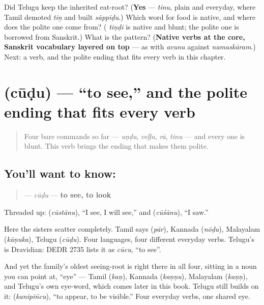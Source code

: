 \begin{tcolorbox}[breakable,colback=teal!4,colframe=teal!35!black,title={Before you move on}]
Did Telugu keep the inherited eat-root? (\textbf{Yes} — \emph{tinu}, plain and everyday, where Tamil demoted \emph{tiṉ} and built \emph{sāppiḍu}.) Which word for food is native, and where does the polite one come from? (\textbf{} \emph{tiṇḍi} is native and blunt; the polite one is borrowed from Sanskrit.) What is the pattern? (\textbf{Native verbs at the core, Sanskrit vocabulary layered on top} — as with \emph{avunu} against \emph{namaskāram}.) Next: a verb, and the polite ending that fits every verb in this chapter.
\end{tcolorbox}
\section[\texorpdfstring{\te{చూడు} (cūḍu)}{చూడు (cūḍu)}]{ (cūḍu) — \textquotedblleft{}to see,\textquotedblright{} and the polite ending that fits every verb}

\label{lesson:TE-C32-cuudu}



\begin{quote}
Four bare commands so far — \emph{uṇḍu}, \emph{veḷḷu}, \emph{rā}, \emph{tinu} — and every one is blunt. This verb brings the ending that makes them polite.
\end{quote}

\subsection*{You'll want to know: }
\begin{quote}
\textbf{} — \emph{cūḍu} — \textbf{to see, to look}
\end{quote}

Threaded up: \textbf{} (\emph{cūstānu}), \textquotedblleft{}I see, I will see,\textquotedblright{} and \textbf{} (\emph{cūśānu}), \textquotedblleft{}I saw.\textquotedblright{}

Here the sisters scatter completely. Tamil says \textbf{} (\emph{pār}), Kannada \textbf{} (\emph{nōḍu}), Malayalam \textbf{} (\emph{kāṇuka}), Telugu \textbf{} (\emph{cūḍu}). Four languages, four different everyday verbs. Telugu's is Dravidian: DEDR 2735 lists it as \emph{cūcu}, \textquotedblleft{}to see\textquotedblright{}.

And yet the family's oldest seeing-root is right there in all four, sitting in a noun you can point at, \textquotedblleft{}eye\textquotedblright{} — Tamil \textbf{} (\emph{kaṇ}), Kannada \textbf{} (\emph{kaṇṇu}), Malayalam \textbf{} (\emph{kaṇṇ}), and Telugu's own eye-word, which comes later in this book. Telugu still builds on it: \textbf{} (\emph{kanipin̄cu}), \textquotedblleft{}to appear, to be visible.\textquotedblright{} Four everyday verbs, one shared eye.

